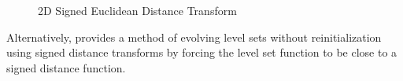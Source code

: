 	\begin{figure}
	  \begin{center}
	  \end{center}
	  \caption{2D Signed Euclidean Distance Transform}
	  \label{fig:sdfexplanation}
	\end{figure}
	
Alternatively, \cite{gui2005lse} provides a method of evolving level sets without reinitialization using signed distance transforms by forcing the level set function to be close to a signed distance function.

